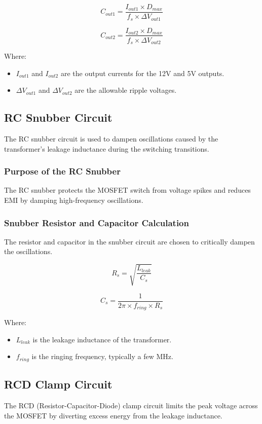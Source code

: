 \documentclass{article}
\begin{document}
\[
C_{out1} = \frac{I_{out1} \times D_{max}}{f_s \times \Delta V_{out1}}
\]

\[
C_{out2} = \frac{I_{out2} \times D_{max}}{f_s \times \Delta V_{out2}}
\]

Where:
\begin{itemize}
    \item $I_{out1}$ and $I_{out2}$ are the output currents for the 12V and 5V outputs.
    \item $\Delta V_{out1}$ and $\Delta V_{out2}$ are the allowable ripple voltages.
\end{itemize}

\subsection{RC Snubber Circuit}
The RC snubber circuit is used to dampen oscillations caused by the transformer's leakage inductance during the switching transitions.

\subsubsection{Purpose of the RC Snubber}
The RC snubber protects the MOSFET switch from voltage spikes and reduces EMI by damping high-frequency oscillations.

\subsubsection{Snubber Resistor and Capacitor Calculation}
The resistor and capacitor in the snubber circuit are chosen to critically dampen the oscillations.

\[
R_s = \sqrt{\frac{L_{leak}}{C_s}}
\]

\[
C_s = \frac{1}{2 \pi \times f_{ring} \times R_s}
\]

Where:
\begin{itemize}
    \item $L_{leak}$ is the leakage inductance of the transformer.
    \item $f_{ring}$ is the ringing frequency, typically a few MHz.
\end{itemize}

\subsection{RCD Clamp Circuit}
The RCD (Resistor-Capacitor-Diode) clamp circuit limits the peak voltage across the MOSFET by diverting excess energy from the leakage inductance.
\end{document}
